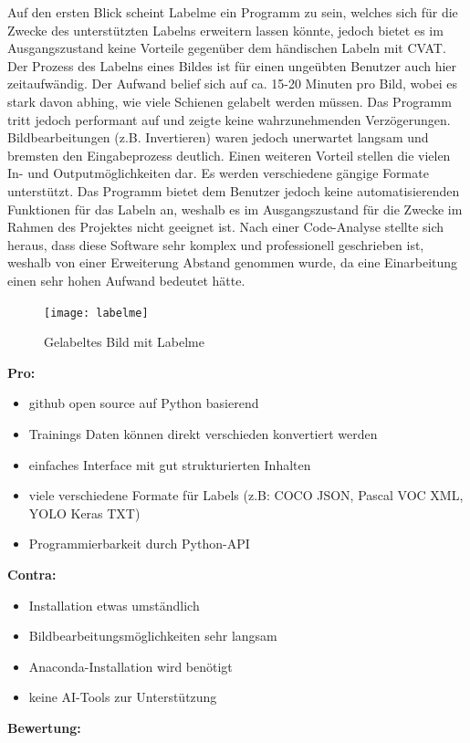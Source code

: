 \documentclass[11pt]{scrartcl}
\begin{document}
\noindent
Auf den ersten Blick scheint Labelme ein Programm zu sein, welches sich für die Zwecke des unterstützten Labelns erweitern lassen könnte, jedoch bietet es im Ausgangszustand keine Vorteile gegenüber dem händischen Labeln mit CVAT. Der Prozess des Labelns eines Bildes ist für einen ungeübten Benutzer auch hier zeitaufwändig. Der Aufwand belief sich auf ca. 15-20 Minuten pro Bild, wobei es stark davon abhing, wie viele Schienen gelabelt werden müssen. Das Programm tritt jedoch performant auf und zeigte keine wahrzunehmenden Verzögerungen. Bildbearbeitungen (z.B. Invertieren) waren jedoch unerwartet langsam und bremsten den Eingabeprozess deutlich. Einen weiteren Vorteil stellen die vielen In- und Outputmöglichkeiten dar. Es werden verschiedene gängige Formate unterstützt. Das Programm bietet dem Benutzer jedoch keine automatisierenden Funktionen für das Labeln an, weshalb es im Ausgangszustand für die Zwecke im Rahmen des Projektes nicht geeignet ist. Nach einer Code-Analyse stellte sich heraus, dass diese Software sehr komplex und professionell geschrieben ist, weshalb von einer Erweiterung Abstand genommen wurde, da eine Einarbeitung einen sehr hohen Aufwand bedeutet hätte. 
\begin{figure}[H]
  \texttt{[image: labelme]}
  \caption{Gelabeltes Bild mit Labelme}
\end{figure}

\textbf{Pro:} 
\begin{itemize}
	\item github open source auf Python basierend
	\item Trainings Daten können direkt verschieden konvertiert werden
	\item einfaches Interface mit gut strukturierten Inhalten
	\item viele verschiedene Formate für Labels (z.B: COCO JSON, Pascal VOC XML, YOLO Keras TXT)
	\item Programmierbarkeit durch Python-API
\end{itemize}
\textbf{Contra:} 
\begin{itemize}
	\item Installation etwas umständlich
	\item Bildbearbeitungsmöglichkeiten sehr langsam
	\item Anaconda-Installation wird benötigt
	\item keine AI-Tools zur Unterstützung	
\end{itemize}


\noindent
\textbf{Bewertung:}
\\
\end{document}
